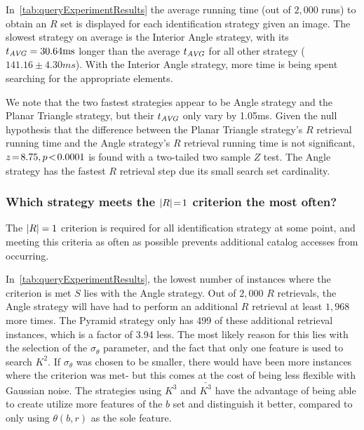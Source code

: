 In~\autoref{tab:queryExperimentResults} the average running time (out of $2{,}000$ runs) to obtain an $R$ set is
displayed for each identification strategy given an image.
The slowest strategy on average is the Interior Angle strategy, with its $t_{\AVG} = 30.64 \si{ms}$ longer than the
average $t_{\AVG}$ for all other strategy ($141.16 \pm 4.30 \si{ms}$).
With the Interior Angle strategy, more time is being spent searching for the appropriate elements.

We note that the two fastest strategies appear to be Angle strategy and the Planar Triangle strategy, but their
$t_\AVG$ only vary by 1.05ms.
Given the null hypothesis that the difference between the Planar Triangle strategy's $R$ retrieval running time and the
Angle strategy's $R$ retrieval running time is not significant, $z \seq 8.75, p\!<\!0.0001$ is found with a two-tailed
two sample $Z$ test.
The Angle strategy has the fastest $R$ retrieval step due its small search set cardinality.

\subsubsection{Which strategy meets the $\abs{R} \seq 1$ criterion the most often?}
The $\abs{R} = 1$ criterion is required for all identification strategy at some point, and meeting this criteria as
often as possible prevents additional catalog accesses from occurring.

In~\autoref{tab:queryExperimentResults}, the lowest number of instances where the criterion is met $S$ lies with the
Angle strategy.
Out of $2{,}000$ $R$ retrievals, the Angle strategy will have had to perform an additional $R$ retrieval at least
$1{,}968$ more times.
The Pyramid strategy only has 499 of these additional retrieval instances, which is a factor of 3.94 less.
The most likely reason for this lies with the selection of the $\sigma_\theta$ parameter, and the fact that only one
feature is used to search $K^2$.
If $\sigma_\theta$ was chosen to be smaller, there would have been more instances where the criterion was met- but
this comes at the cost of being less flexible with Gaussian noise.
The strategies using $K^3$ and $\bar{K^3}$ have the advantage of being able to create utilize more features of the
$b$ set and distinguish it better, compared to only using $\theta(b, r)$ as the sole feature.

